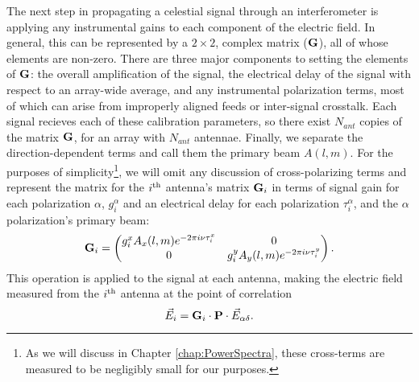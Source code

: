 The next step in propagating a celestial signal through an interferometer is applying any
instrumental gains to each component of the electric field. In general, this can be represented by a
$2\times2$, complex matrix ($\mathbf{G}$), all of whose elements are non-zero. There are three major components 
to setting the elements of $\mathbf{G}$: the overall amplification of the signal, the electrical
delay of the signal with respect to an array-wide average, and any instrumental polarization terms,
most of which can arise from improperly aligned feeds or inter-signal crosstalk. Each signal
recieves each of these calibration parameters, so there exist $N_{ant}$ copies of the matrix
$\mathbf{G}$, for an array with $N_{ant}$ antennae. Finally, we separate the direction-dependent terms
and call them the primary beam $A(l,m)$. For the purposes of simplicity\footnote{As we 
  will discuss in Chapter \ref{chap:PowerSpectra}, these cross-terms are measured to be negligibly 
small for our purposes.}, we will omit any discussion of cross-polarizing terms and represent the 
matrix for the $i^{\rm th}$ antenna's matrix $\mathbf{G}_i$ in terms of signal gain for each polarization
$\alpha$, $g_i^\alpha$ and an electrical delay for each polarization
$\tau_i^\alpha$, and the
$\alpha$ polarization's primary beam:
\begin{equation}
  \mathbf{G}_i = \begin{pmatrix}
    g_i^xA_x(l,m)e^{-2\pi i \nu \tau_i^x} & 0 \\          
    0 & g_i^yA_y(l,m)e^{-2\pi i \nu \tau_i^y}          
  \end{pmatrix}.
  \label{eq:def_gains}
\end{equation}
This operation is applied to the signal at each antenna, making the electric field measured from the
$i^{\rm th}$ antenna at the point of correlation 
\begin{equation}
  \vec{E}_i = \mathbf{G}_i\cdot\mathbf{P}\cdot\vec{E}_{\alpha\delta}. 
\end{equation}


